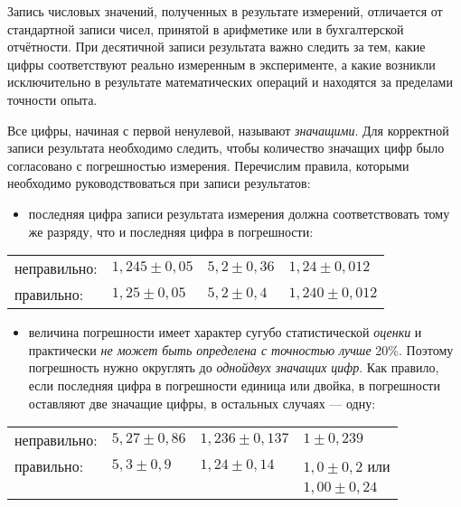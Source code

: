 Запись числовых значений, полученных в результате измерений, отличается
от стандартной записи чисел, принятой в арифметике или в бухгалтерской
отчётности. При десятичной записи результата важно следить за тем,
какие цифры соответствуют реально измеренным в эксперименте, а какие
возникли исключительно в результате математических операций и находятся
за пределами точности опыта.

Все цифры, начиная с первой ненулевой, называют \emph{значащими}.
Для корректной записи результата необходимо следить, чтобы количество
значащих цифр было согласовано с погрешностью измерения. Перечислим
правила, которыми необходимо руководствоваться при записи результатов: 
\begin{itemize}
\item последняя цифра записи результата измерения должна соответствовать
тому же разряду, что и последняя цифра в погрешности:
\end{itemize}
\noindent%
\begin{tabular}{llll}
неправильно:  & $1{,}245\pm0{,}05$  & $5{,}2\pm0{,}36$  & $1{,}24\pm0{,}012$\tabularnewline
правильно:  & $1{,}25\pm0{,}05$  & $5{,}2\pm0{,}4$  & $1{,}240\pm0{,}012$ \tabularnewline
\end{tabular}
\begin{itemize}
\item величина погрешности имеет характер сугубо статистической \emph{оценки}
и практически \emph{не может быть определена с точностью лучше} 20\%.
Поэтому погрешность нужно округлять до \emph{одной\textendash двух
значащих цифр}. Как правило, если последняя цифра в погрешности единица
или двойка, в погрешности оставляют две значащие цифры, в остальных
случаях --- одну:
\end{itemize}
\noindent%
\begin{tabular}{llll}
неправильно:  & $5{,}27\pm0{,}86$  & $1{,}236\pm0{,}137$  & $1\pm0{,}239$\tabularnewline
правильно:  & $5{,}3\pm0{,}9$ & $1{,}24\pm0{,}14$ & $1{,}0\pm0{,}2$ или\tabularnewline
 &  &  & $1{,}00\pm0{,}24$\tabularnewline
\end{tabular}

\medskip{}

